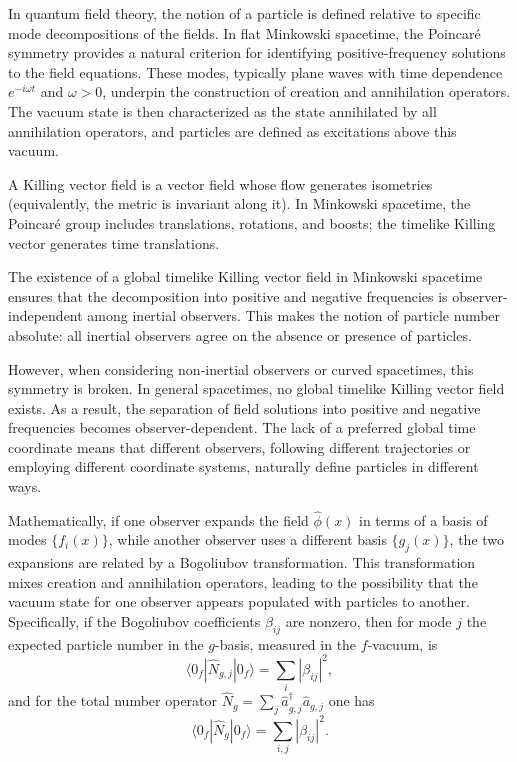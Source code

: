 In quantum field theory, the notion of a particle is defined relative to specific mode decompositions of the fields. In flat Minkowski spacetime, the Poincaré symmetry provides a natural criterion for identifying positive-frequency solutions to the field equations. These modes, typically plane waves with time dependence $e^{-i\omega t}$ and $\omega > 0$, underpin the construction of creation and annihilation operators. The vacuum state is then characterized as the state annihilated by all annihilation operators, and particles are defined as excitations above this vacuum.

A Killing vector field is a vector field whose flow generates isometries (equivalently, the metric is invariant along it). In Minkowski spacetime, the Poincaré group includes translations, rotations, and boosts; the timelike Killing vector generates time translations.

The existence of a global timelike Killing vector field in Minkowski spacetime ensures that the decomposition into positive and negative frequencies is observer-independent among inertial observers. This makes the notion of particle number absolute: all inertial observers agree on the absence or presence of particles.

However, when considering non-inertial observers or curved spacetimes, this symmetry is broken. In general spacetimes, no global timelike Killing vector field exists. As a result, the separation of field solutions into positive and negative frequencies becomes observer-dependent. The lack of a preferred global time coordinate means that different observers, following different trajectories or employing different coordinate systems, naturally define particles in different ways.

Mathematically, if one observer expands the field $\hat{\phi}(x)$ in terms of a basis of modes $\{f_i(x)\}$, while another observer uses a different basis $\{g_j(x)\}$, the two expansions are related by a Bogoliubov transformation. This transformation mixes creation and annihilation operators, leading to the possibility that the vacuum state for one observer appears populated with particles to another. Specifically, if the Bogoliubov coefficients $\beta_{ij}$ are nonzero, then for mode $j$ the expected particle number in the $g$-basis, measured in the $f$-vacuum, is
\[
\langle 0_f | \hat{N}_{g,j} | 0_f \rangle = \sum_i |\beta_{ij}|^2,
\]
and for the total number operator $\hat{N}_g = \sum_j \hat{a}_{g,j}^\dagger \hat{a}_{g,j}$ one has
\[
\langle 0_f | \hat{N}_g | 0_f \rangle = \sum_{i,j} |\beta_{ij}|^2.
\]

